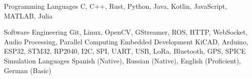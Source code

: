 

\begin{cvskills}

  \cvskill
    {Programming Languages} %
    {C, C++, Rust, Python, Java, Kotlin, JavaScript, MATLAB, Julia} %

  \cvskill
    {Software Engineering} %
    {Git, Linux, OpenCV, GStreamer, ROS, HTTP, WebSocket, Audio Processing, Parallel Computing} %
  \cvskill
    {Embedded Development} %
    {KiCAD, Arduino, ESP32, STM32, RP2040, I2C, SPI, UART, USB, LoRa, Bluetooth, GPS, SPICE Simulation} %
  \cvskill
    {Languages} %
    {Spanish (Native), Russian (Native), English (Proficient), German (Basic)} %

\end{cvskills}
